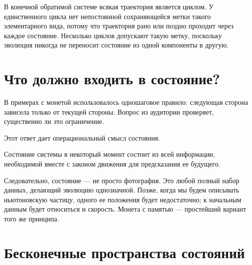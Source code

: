 В конечной обратимой системе всякая траектория является циклом. У единственного цикла нет непостоянной сохраняющейся метки такого элементарного вида, потому что траектория рано или поздно проходит через каждое состояние. Несколько циклов допускают такую метку, поскольку эволюция никогда не переносит состояние из одной компоненты в другую.

\section{Что должно входить в состояние?}

В примерах с монетой использовалось одношаговое правило: следующая сторона зависела только от текущей стороны. Вопрос из аудитории проверяет, существенно ли это ограничение.

\begin{classroomqa}

\end{classroomqa}

Этот ответ дает операциональный смысл состояния.

\begin{definition}
Состояние системы в некоторый момент состоит из всей информации, необходимой вместе с законом движения для предсказания ее будущего.
\end{definition}

Следовательно, состояние — не просто фотография. Это любой полный набор данных, делающий эволюцию однозначной. Позже, когда мы будем описывать ньютоновскую частицу, одного ее положения будет недостаточно; к начальным данным будет относиться и скорость. Монета с памятью — простейший вариант того же принципа.

\section{Бесконечные пространства состояний}

